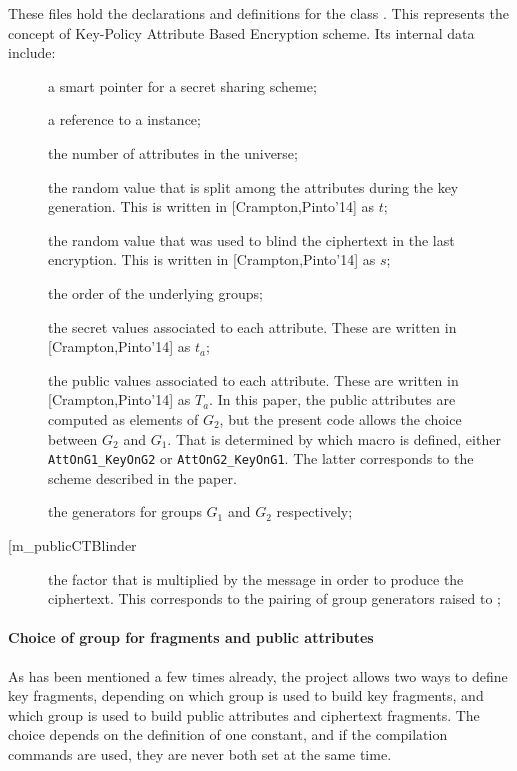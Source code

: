 \documentclass{article}
\begin{document}
These files hold the declarations and definitions for the class \cKPABE. This represents the concept of Key-Policy Attribute Based Encryption scheme. Its internal data include:
\begin{description}
\item[] a smart pointer for a secret sharing scheme;
\item[] a reference to a \cPFC instance;
\item[] the number of attributes in the universe;
\item[] the random value that is split among the attributes during the key generation. This is written in [Crampton,Pinto'14] as $t$;
\item[] the random value that was used to blind the ciphertext in the last encryption. This is written in [Crampton,Pinto'14] as $s$;
\item[] the order of the underlying groups;
\item[] the secret values associated to each attribute. These are written in [Crampton,Pinto'14] as $t_a$;
\item[] the public values associated to each attribute. These are written in [Crampton,Pinto'14] as $T_a$. In this paper, the public attributes are computed as elements of $G_2$, but the present code allows the choice between $G_2$ and $G_1$. That is determined by which macro is defined, either \verb|AttOnG1_KeyOnG2| or \verb|AttOnG2_KeyOnG1|. The latter corresponds to the scheme described in the paper.
\item[] the generators for groups $G_1$ and $G_2$ respectively;
\item[\code[m\_publicCTBlinder] the factor that is multiplied by the message in order to produce the ciphertext. This corresponds to the pairing of group generators raised to ;

\end{description}

\paragraph{Choice of group for fragments and public attributes}

As has been mentioned a few times already, the project allows two ways to define key fragments, depending on which group is used to build key fragments, and which group is used to build public attributes and ciphertext fragments. The choice depends on the definition of one constant, and if the compilation commands are used, they are never both set at the same time.
\end{document}
